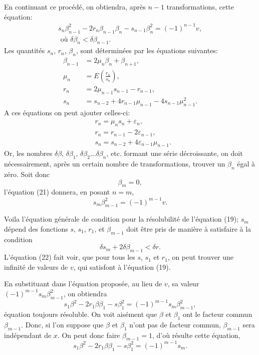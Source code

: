 \documentclass[oneside, 12 pt, leqno]{memoir}
\begin{document}
En continuant ce procédé, on obtiendra, après \(n-1\) transformations, cette équation:
\[\tag{21}\begin{gathered}
s_n \beta_{n-1}^2-2 r_n \beta_{n-1} \beta_n-s_{n-1} \beta_n^2=(-1)^{n-1} v, \\
\text { où } \delta \beta_n<\delta \beta_{n-1}.
\end{gathered}\]
Les quantités \(s_n\), \(r_n\), \(\beta_n\), sont déterminées par les équations suivantes:
\[\begin{aligned}
\beta_{n-1} & =2 \mu_n \beta_n+\beta_{n+1}, \\
\mu_n & =E\left(\frac{r_n}{s_n}\right), \\
r_n & =2 \mu_{n-1} s_{n-1}-r_{n-1}, \\
s_n & =s_{n-2}+4 r_{n-1} \mu_{n-1}-4 s_{n-1} \mu_{n-1}^2.
\end{aligned}\]
A ces équations on peut ajouter celles-ci:
\[\begin{aligned}
& r_n=\mu_n s_n+\varepsilon_n, \\
& r_n=r_{n-1}-2 \varepsilon_{n-1}, \\
& s_n=s_{n-2}+4 \varepsilon_{n-1} \mu_{n-1}.
\end{aligned}\]
Or, les nombres \(\delta \beta\), \(\delta \beta_1\), \(\delta {\beta}_2 \dots \delta {\beta}_n\), etc. formant une série décroissante, on doit nécessairement, après un certain nombre de transformations, trouver un \(\beta_n\) égal à zéro. Soit donc
\[\beta_m=0,\]
l'équation (21) donnera, en posant \(n=m\),
\[\tag{22} s_m \beta_{m-1}^2=(-1)^{m-1} v.\]

Voila l'équation générale de condition pour la résolubilité de l'équation (19); \(s_m\) dépend des fonctions \(s\), \(s_1\), \(r_1\), et \(\beta_{m-1}\) doit être pris de manière à satisfaire à la condition
\[\delta s_m+2 \delta \beta_{m-1}<\delta r.\]
L'équation (22) fait voir, que pour tous les \(s\), \(s_1\) et \(r_1\), on peut trouver une infinité de valeurs de \(v\), qui satisfont à l'équation (19).

En substituant dans l'équation proposée, au lieu de \(v\), sa valeur \((-1)^{m-1} s_m \beta_{m-1}^2\), on obtiendra
\[s_1 \beta^2-2 r_1 \beta \beta_1-s \beta_1^2=(-1)^{m-1} s_m \beta_{m-1}^2,\]
équation toujours résoluble. On voit aisément que \(\beta\) et \(\beta_1\) ont le facteur commun \(\beta_{m-1}\). Donc, si l'on suppose que \(\beta\) et \(\beta_1\) n'ont pas de facteur commun, \(\beta_{m-1}\) sera indépendant de \(x\). On peut donc faire \(\beta_{m-1}=1\), d'où résulte cette équation,
\[s_1 \beta^2-2 r_1 \beta \beta_1-s \beta_1^2=(-1)^{m-1} s_m.\]
\end{document}
